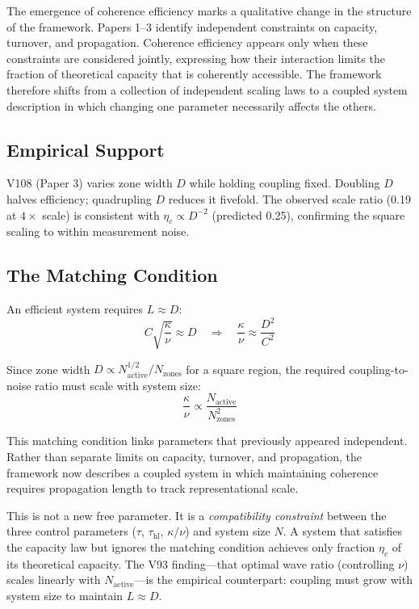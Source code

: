 \documentclass[11pt]{article}
\begin{document}
The emergence of coherence efficiency marks a qualitative change in the structure of the framework. Papers 1--3 identify independent constraints on capacity, turnover, and propagation. Coherence efficiency appears only when these constraints are considered jointly, expressing how their interaction limits the fraction of theoretical capacity that is coherently accessible. The framework therefore shifts from a collection of independent scaling laws to a coupled system description in which changing one parameter necessarily affects the others.

\subsection{Empirical Support}

V108 (Paper 3) varies zone width $D$ while holding coupling fixed. Doubling $D$ halves efficiency; quadrupling $D$ reduces it fivefold. The observed scale ratio (0.19 at $4\times$ scale) is consistent with $\eta_c \propto D^{-2}$ (predicted 0.25), confirming the square scaling to within measurement noise.

\subsection{The Matching Condition}

An efficient system requires $L \approx D$:
\begin{equation}
  C\sqrt{\frac{\kappa}{\nu}} \approx D
  \quad \Longrightarrow \quad
  \frac{\kappa}{\nu} \approx \frac{D^2}{C^2}
  \label{eq:matching}
\end{equation}

Since zone width $D \propto N_{\text{active}}^{1/2} / N_{\text{zones}}$ for a square region, the required coupling-to-noise ratio must scale with system size:
\begin{equation}
  \frac{\kappa}{\nu} \propto \frac{N_{\text{active}}}{N_{\text{zones}}^2}
\end{equation}

This matching condition links parameters that previously appeared independent. Rather than separate limits on capacity, turnover, and propagation, the framework now describes a coupled system in which maintaining coherence requires propagation length to track representational scale.

This is not a new free parameter. It is a \emph{compatibility constraint} between the three control parameters ($\tau$, $\tau_{\text{hl}}$, $\kappa/\nu$) and system size $N$. A system that satisfies the capacity law but ignores the matching condition achieves only fraction $\eta_c$ of its theoretical capacity. The V93 finding---that optimal wave ratio (controlling $\nu$) scales linearly with $N_{\text{active}}$---is the empirical counterpart: coupling must grow with system size to maintain $L \approx D$.
\end{document}
